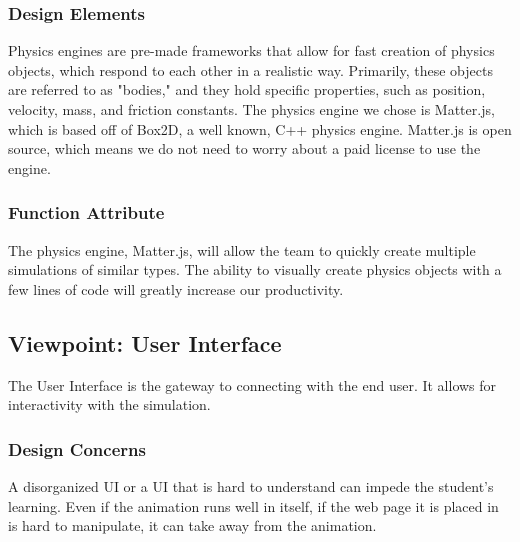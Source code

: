 \subsubsection{Design Elements}
Physics engines are pre-made frameworks that allow for fast creation of physics objects, which respond to each other in a realistic way. Primarily, these objects are referred to as "bodies," and they hold specific properties, such as position, velocity, mass, and friction constants. The physics engine we chose is Matter.js, which is based off of Box2D, a well known, C++ physics engine. Matter.js is open source, which means we do not need to worry about a paid license to use the engine.

\subsubsection{Function Attribute}
The physics engine, Matter.js, will allow the team to quickly create multiple simulations of similar types. The ability to visually create physics objects with a few lines of code will greatly increase our productivity.
\newline


\subsection{Viewpoint: User Interface}
The User Interface is the gateway to connecting with the end user. It allows for interactivity with the simulation.

\subsubsection{Design Concerns}
A disorganized UI or a UI that is hard to understand can impede the student's learning. Even if the animation runs well in itself, if the web page it is placed in is hard to manipulate, it can take away from the animation. 


